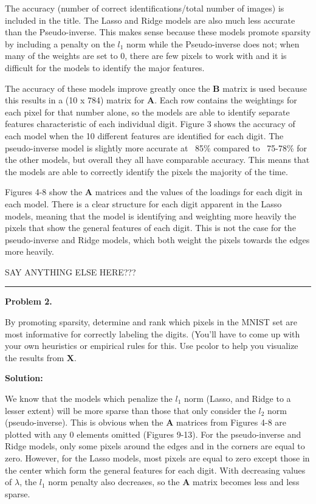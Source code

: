 \documentclass[10pt]{article}
\begin{document}
The accuracy (number of correct identifications/total number of images) is included in the title. The Lasso and Ridge models are also much less accurate than the Pseudo-inverse. This makes sense because these models promote sparsity by including a penalty on the $l_1$ norm while the Pseudo-inverse does not; when many of the weights are set to 0, there are few pixels to work with and it is difficult for the models to identify the major features.

The accuracy of these models improve greatly once the  $\textbf{B}$ matrix is used because this results in a (10 x 784) matrix for  $\textbf{A}$. Each row contains the weightings for each pixel for that number alone, so the models are able to identify separate features characteristic of each individual digit. Figure 3 shows the accuracy of each model when the 10 different features are identified for each digit. The pseudo-inverse model is slightly more accurate at ~85\% compared to ~75-78\% for the other models, but overall they all have comparable accuracy. This means that the models are able to correctly identify the pixels the majority of the time. %

Figures 4-8 show the $\textbf{A}$ matrices and the values of the loadings for each digit in each model. There is a clear structure for each digit apparent in the Lasso models, meaning that the model is identifying and weighting more heavily the pixels that show the general features of each digit. This is not the case for the pseudo-inverse and Ridge models, which both weight the pixels towards the edges more heavily. %

{\color{red} SAY ANYTHING ELSE HERE???}


\vskip 1cm
\hrule
{\bf Problem 2.}

By promoting sparsity, determine and rank which pixels in the MNIST set are most informative for correctly labeling the digits. (You’ll have to come up with your own heuristics or empirical rules for this. Use pcolor to help you visualize the results from $\textbf{X}$.

\vskip 0.5cm
{\bf Solution:}

We know that the models which penalize the $l_1$ norm (Lasso, and Ridge to a lesser extent) will be more sparse than those that only consider the $l_2$ norm (pseudo-inverse). This is obvious when the $\textbf{A}$ matrices from Figures 4-8 are plotted with any 0 elements omitted (Figures 9-13). For the pseudo-inverse and Ridge models, only some pixels around the edges and in the corners are equal to zero. However, for the Lasso models, most pixels are equal to zero except those in the center which form the general features for each digit. With decreasing values of $\lambda$, the $l_1$ norm penalty also decreases, so the $\textbf{A}$ matrix becomes less and less sparse. %
\end{document}
